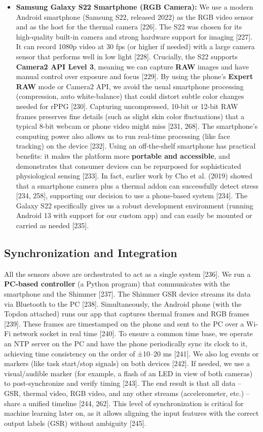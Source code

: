 \documentclass{article}
\begin{document}
\begin{itemize}
        \item \textbf{Samsung Galaxy S22 Smartphone (RGB Camera):} We use a modern Android smartphone (Samsung S22, released 2022) as the RGB video sensor and as the host for the thermal camera [226]. The S22 was chosen for its high-quality built-in camera and strong hardware support for imaging [227]. It can record 1080p video at 30 fps (or higher if needed) with a large camera sensor that performs well in low light [228]. Crucially, the S22 supports \textbf{Camera2 API Level 3}, meaning we can capture \textbf{RAW} images and have manual control over exposure and focus [229]. By using the phone’s \textbf{Expert RAW} mode or Camera2 API, we avoid the usual smartphone processing (compression, auto white-balance) that could distort subtle color changes needed for rPPG [230]. Capturing uncompressed, 10-bit or 12-bit RAW frames preserves fine details (such as slight skin color fluctuations) that a typical 8-bit webcam or phone video might miss [231, 268]. The smartphone’s computing power also allows us to run real-time processing (like face tracking) on the device [232]. Using an off-the-shelf smartphone has practical benefits: it makes the platform more \textbf{portable and accessible}, and demonstrates that consumer devices can be repurposed for sophisticated physiological sensing [233]. In fact, earlier work by Cho et al. (2019) showed that a smartphone camera plus a thermal addon can successfully detect stress [234, 258], supporting our decision to use a phone-based system [234]. The Galaxy S22 specifically gives us a robust development environment (running Android 13 with support for our custom app) and can easily be mounted or carried as needed [235].
    \end{itemize}

    \subsection*{Synchronization and Integration}
    All the sensors above are orchestrated to act as a single system [236]. We run a \textbf{PC-based controller} (a Python program) that communicates with the smartphone and the Shimmer [237]. The Shimmer GSR device streams its data via Bluetooth to the PC [238]. Simultaneously, the Android phone (with the Topdon attached) runs our app that captures thermal frames and RGB frames [239]. These frames are timestamped on the phone and sent to the PC over a Wi-Fi network socket in real time [240]. To ensure a common time base, we operate an NTP server on the PC and have the phone periodically sync its clock to it, achieving time consistency on the order of ±10–20 ms [241]. We also log events or markers (like task start/stop signals) on both devices [242]. If needed, we use a visual/audible marker (for example, a flash of an LED in view of both cameras) to post-synchronize and verify timing [243]. The end result is that all data – GSR, thermal video, RGB video, and any other streams (accelerometer, etc.) – share a unified timeline [244, 262]. This level of synchronization is critical for machine learning later on, as it allows aligning the input features with the correct output labels (GSR) without ambiguity [245].
\end{document}
